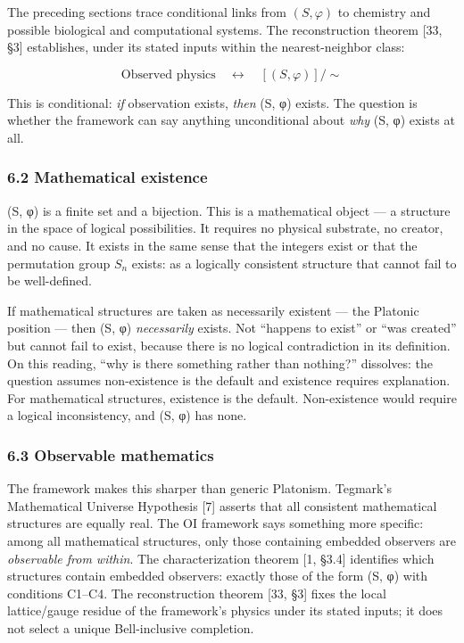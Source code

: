 \documentclass[
]{article}
\begin{document}
The preceding sections trace conditional links from \((S, \varphi)\) to
chemistry and possible biological and computational systems. The
reconstruction theorem {[}33, §3{]} establishes, under its stated inputs
within the nearest-neighbor class:

\[\text{Observed physics} \quad \longleftrightarrow \quad [(S, \varphi)] / \sim\]

This is conditional: \emph{if} observation exists, \emph{then} (S, φ)
exists. The question is whether the framework can say anything
unconditional about \emph{why} (S, φ) exists at all.

\hypertarget{mathematical-existence}{%
\subsubsection{6.2 Mathematical
existence}\label{mathematical-existence}}

(S, φ) is a finite set and a bijection. This is a mathematical object
--- a structure in the space of logical possibilities. It requires no
physical substrate, no creator, and no cause. It exists in the same
sense that the integers exist or that the permutation group \(S_n\)
exists: as a logically consistent structure that cannot fail to be
well-defined.

If mathematical structures are taken as necessarily existent --- the
Platonic position --- then (S, φ) \emph{necessarily} exists. Not
``happens to exist'' or ``was created'' but cannot fail to exist,
because there is no logical contradiction in its definition. On this
reading, ``why is there something rather than nothing?'' dissolves: the
question assumes non-existence is the default and existence requires
explanation. For mathematical structures, existence is the default.
Non-existence would require a logical inconsistency, and (S, φ) has
none.

\hypertarget{observable-mathematics}{%
\subsubsection{6.3 Observable
mathematics}\label{observable-mathematics}}

The framework makes this sharper than generic Platonism. Tegmark's
Mathematical Universe Hypothesis {[}7{]} asserts that all consistent
mathematical structures are equally real. The OI framework says
something more specific: among all mathematical structures, only those
containing embedded observers are \emph{observable from within}. The
characterization theorem {[}1, §3.4{]} identifies which structures
contain embedded observers: exactly those of the form (S, φ) with
conditions C1--C4. The reconstruction theorem {[}33, §3{]} fixes the
local lattice/gauge residue of the framework's physics under its stated
inputs; it does not select a unique Bell-inclusive completion.
\end{document}
